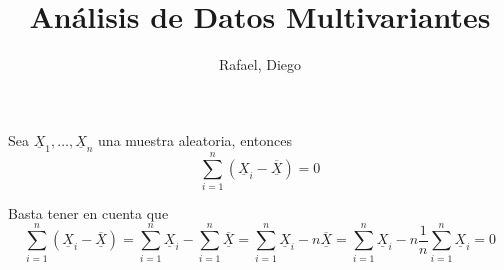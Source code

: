 \documentclass[twoside]{article}
\newcommand{\x}{\underline{X}}
\renewcommand{\X}{\overline{\underline{X}}}
\begin{document}
\title{Análisis de Datos Multivariantes}
\author{Rafael, Diego}
\maketitle
\begin{ejercicio}{1} Sea $\x_1,\dotsc,\x_n$ una muestra aleatoria, entonces
$$
\sum_{i=1}^n (\x_i-\X) = 0
$$
\end{ejercicio}
\begin{solucion}
Basta tener en cuenta que 
$$
\sum_{i=1}^n (\x_i-\X) = \sum_{i=1}^n \x_i - \sum_{i=1}^n \X = \sum_{i=1}^n \x_i  - n \X = \sum_{i=1}^n \x_i  - n \frac{1}{n} \sum_{i=1}^n \x_i  =0
$$
\end{solucion}
\end{document}
